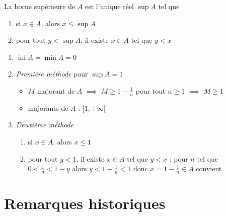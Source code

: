 \begin{frame}
\begin{proposition}
La borne supérieure de $A$ est l'unique réel $\sup A$ tel que
\begin{enumerate}
\item[(i)] si $x\in A$, alors $x\leq \sup A$
\item[(ii)] pour tout $y<\sup A$, il existe $x\in A$ tel que $y<x$
\end{enumerate}
\end{proposition}

\pause

\begin{exemple}[$A=\big\{ 1-\frac{1}{n} \mid n\in \Nn^* \big\}$]
\vspace*{-6ex}
\pause
\begin{enumerate}
  \item $\inf A= \min A=0$
\pause
  \item \emph{Première méthode} pour $\sup A=1$
  \begin{itemize}
\pause
    \item $M$ majorant de $A$ $\implies$ $M \ge 1-\frac 1n$ pour tout $n\ge 1$ $\implies$ $M\ge 1$
\pause
    \item majorants de $A$ : $[1,+\infty[$
  \end{itemize}
\pause
  \item \emph{Deuxième méthode}
\pause
  \begin{enumerate}
     \item[(i)] si $x\in A$, alors $x\leq 1$
\pause
     \item[(ii)] pour tout $y< 1$, il existe $x\in A$ tel que $y<x$ \pause :
pour $n$ tel que $0<\frac 1n < 1-y$ alors $y < 1-\frac 1n < 1$
\pause donc $x=1-\frac 1n \in A$ convient
   \end{enumerate}
\end{enumerate}
\end{exemple}
\end{frame}



\section*{Remarques historiques}

